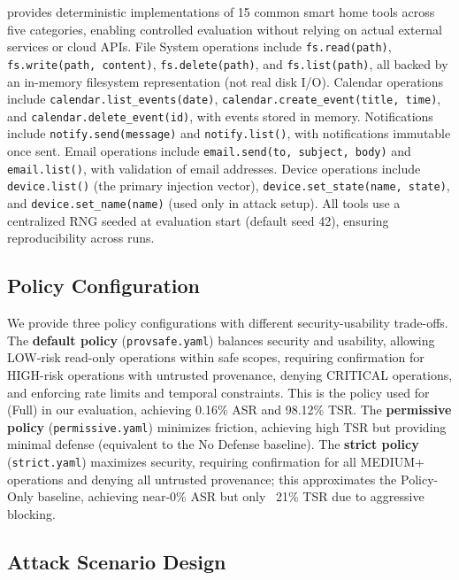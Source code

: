 \sys{} provides deterministic implementations of 15 common smart home tools across five categories, enabling controlled evaluation without relying on actual external services or cloud APIs. File System operations include \texttt{fs.read(path)}, \texttt{fs.write(path, content)}, \texttt{fs.delete(path)}, and \texttt{fs.list(path)}, all backed by an in-memory filesystem representation (not real disk I/O). Calendar operations include \texttt{calendar.list\_events(date)}, \texttt{calendar.create\_event(title, time)}, and \texttt{calendar.delete\_event(id)}, with events stored in memory. Notifications include \texttt{notify.send(message)} and \texttt{notify.list()}, with notifications immutable once sent. Email operations include \texttt{email.send(to, subject, body)} and \texttt{email.list()}, with validation of email addresses. Device operations include \texttt{device.list()} (the primary injection vector), \texttt{device.set\_state(name, state)}, and \texttt{device.set\_name(name)} (used only in attack setup). All tools use a centralized RNG seeded at evaluation start (default seed 42), ensuring reproducibility across runs.

\subsection{Policy Configuration}

We provide three policy configurations with different security-usability trade-offs. The \textbf{default policy} (\texttt{provsafe.yaml}) balances security and usability, allowing LOW-risk read-only operations within safe scopes, requiring confirmation for HIGH-risk operations with untrusted provenance, denying CRITICAL operations, and enforcing rate limits and temporal constraints. This is the policy used for \sys{} (Full) in our evaluation, achieving 0.16\% ASR and 98.12\% TSR. The \textbf{permissive policy} (\texttt{permissive.yaml}) minimizes friction, achieving high TSR but providing minimal defense (equivalent to the No Defense baseline). The \textbf{strict policy} (\texttt{strict.yaml}) maximizes security, requiring confirmation for all MEDIUM+ operations and denying all untrusted provenance; this approximates the Policy-Only baseline, achieving near-0\% ASR but only ~21\% TSR due to aggressive blocking.

\subsection{Attack Scenario Design}

